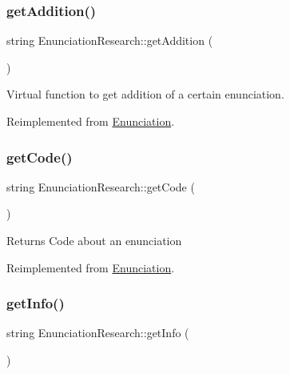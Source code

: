 \subsubsection{\texorpdfstring{get\+Addition()}{getAddition()}}
{\footnotesize\ttfamily string Enunciation\+Research\+::get\+Addition (\begin{DoxyParamCaption}{ }\end{DoxyParamCaption})\hspace{0.3cm}{\ttfamily [virtual]}}



Virtual function to get addition of a certain enunciation. 



Reimplemented from \hyperlink{class_enunciation_ad0bf6d8d34f6246cd5bc674b15b5958b}{Enunciation}.

\mbox{\label{class_enunciation_research_a424e392956c1c7bbccfdf74d72b3d4dd}} 
\subsubsection{\texorpdfstring{get\+Code()}{getCode()}}
{\footnotesize\ttfamily string Enunciation\+Research\+::get\+Code (\begin{DoxyParamCaption}{ }\end{DoxyParamCaption})\hspace{0.3cm}{\ttfamily [virtual]}}

\begin{DoxyReturn}{Returns}
Code about an enunciation 
\end{DoxyReturn}


Reimplemented from \hyperlink{class_enunciation_a2c27d4c83302dd7d21e1064c9e4ec97d}{Enunciation}.

\mbox{\label{class_enunciation_research_a57ce30430703246bdd6a1103530a8a5f}} 
\subsubsection{\texorpdfstring{get\+Info()}{getInfo()}}
{\footnotesize\ttfamily string Enunciation\+Research\+::get\+Info (\begin{DoxyParamCaption}{ }\end{DoxyParamCaption})\hspace{0.3cm}{\ttfamily [virtual]}}

